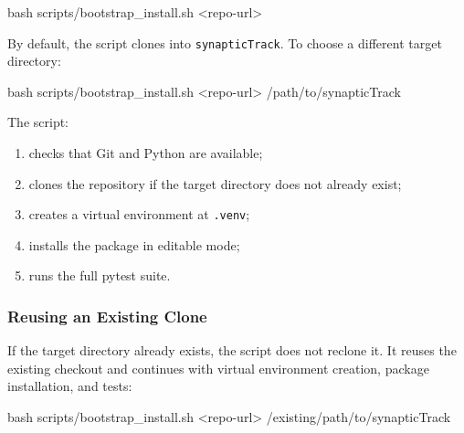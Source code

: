 \documentclass[
]{article}
\newenvironment{Shaded}{}{}
\newcommand{\FunctionTok}[1]{\textcolor[rgb]{0.02,0.16,0.49}{#1}}
\newcommand{\NormalTok}[1]{#1}
\newcommand{\OperatorTok}[1]{\textcolor[rgb]{0.40,0.40,0.40}{#1}}
\providecommand{\tightlist}{%
  \setlength{\itemsep}{0pt}\setlength{\parskip}{0pt}}
\begin{document}
\begin{Shaded}
\begin{Highlighting}[]
\FunctionTok{bash}\NormalTok{ scripts/bootstrap\_install.sh }\OperatorTok{\textless{}}\NormalTok{repo{-}url}\OperatorTok{\textgreater{}}
\end{Highlighting}
\end{Shaded}

By default, the script clones into \texttt{synapticTrack}. To choose a
different target directory:

\begin{Shaded}
\begin{Highlighting}[]
\FunctionTok{bash}\NormalTok{ scripts/bootstrap\_install.sh }\OperatorTok{\textless{}}\NormalTok{repo{-}url}\OperatorTok{\textgreater{}}\NormalTok{ /path/to/synapticTrack}
\end{Highlighting}
\end{Shaded}

The script:

\begin{enumerate}
\def\labelenumi{\arabic{enumi}.}
\tightlist
\item
  checks that Git and Python are available;
\item
  clones the repository if the target directory does not already exist;
\item
  creates a virtual environment at \texttt{.venv};
\item
  installs the package in editable mode;
\item
  runs the full pytest suite.
\end{enumerate}

\hypertarget{reusing-an-existing-clone}{%
\subsubsection{Reusing an Existing
Clone}\label{reusing-an-existing-clone}}

If the target directory already exists, the script does not reclone it.
It reuses the existing checkout and continues with virtual environment
creation, package installation, and tests:

\begin{Shaded}
\begin{Highlighting}[]
\FunctionTok{bash}\NormalTok{ scripts/bootstrap\_install.sh }\OperatorTok{\textless{}}\NormalTok{repo{-}url}\OperatorTok{\textgreater{}}\NormalTok{ /existing/path/to/synapticTrack}
\end{Highlighting}
\end{Shaded}
\end{document}
